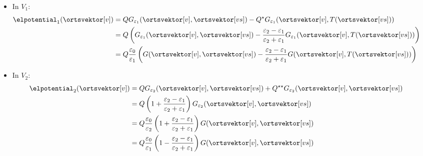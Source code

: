 \begin{frame}
\begin{columns}
\begin{column}{.35\textwidth}
\begin{tikzpicture}[line width = 1.2pt, line join=round,>=stealth]
\end{tikzpicture}
       \end{column}
       \begin{column}{.65\textwidth}
         \begin{itemize}[<+->]
           \item In $V_1$:
      \begin{align*}
        \elpotential_1(\ortsvektor[v]) & = Q G_{\varepsilon_1}(\ortsvektor[v], \ortsvektor[vs]) -  Q^\star G_{\varepsilon_1}(\ortsvektor[v], T(\ortsvektor[vs]))\\
        & = Q\left( G_{\varepsilon_1}(\ortsvektor[v], \ortsvektor[vs]) -  \frac{\varepsilon_2-\varepsilon_1}{\varepsilon_2+\varepsilon_1} G_{\varepsilon_1}(\ortsvektor[v], T(\ortsvektor[vs]))\right)\\
        & = Q\frac{\varepsilon_0}{\varepsilon_1}\left( G(\ortsvektor[v], \ortsvektor[vs]) -  \frac{\varepsilon_2-\varepsilon_1}{\varepsilon_2+\varepsilon_1} G(\ortsvektor[v], T(\ortsvektor[vs]))\right)
        \end{align*}
    \item In $V_2$:
      \begin{align*}
        \elpotential_2(\ortsvektor[v]) & = Q G_{\varepsilon_2}(\ortsvektor[v], \ortsvektor[vs]) +  Q^{\star\star} G_{\varepsilon_2}(\ortsvektor[v], \ortsvektor[vs])\\
                                       & = Q \left( 1 +  \frac{\varepsilon_2-\varepsilon_1}{\varepsilon_2+\varepsilon_1}\right) G_{\varepsilon_2}(\ortsvektor[v], \ortsvektor[vs]) \\
                                       & = Q\frac{\varepsilon_0}{\varepsilon_2} \left( 1 +  \frac{\varepsilon_2-\varepsilon_1}{\varepsilon_2+\varepsilon_1}\right) G(\ortsvektor[v], \ortsvektor[vs]) \\
                                       & = Q\frac{\varepsilon_0}{\varepsilon_1} \left( 1 -  \frac{\varepsilon_2-\varepsilon_1}{\varepsilon_2+\varepsilon_1}\right) G(\ortsvektor[v], \ortsvektor[vs]) 
      \end{align*}
          \end{itemize}
       \end{column}
     \end{columns}
\end{frame}      

